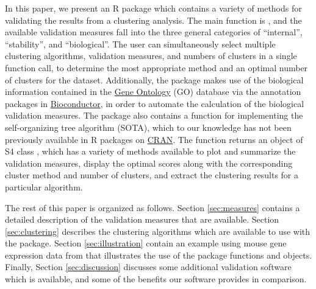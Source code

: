 \documentclass[11pt]{article}
\begin{document}
In this paper, we present an R package  which contains a
variety of methods for validating the results
from a clustering analysis.  
The main function is , and the available validation measures fall into the three general
categories of ``internal'', ``stability'', and ``biological''.  
The user can simultaneously select multiple clustering algorithms,
validation measures, and numbers of clusters in a single function call,
to determine the most appropriate method and
an optimal number of clusters for the dataset.  
Additionally, the  package
makes use of the biological information contained in the 
\href{http://www.geneontology.org/}{Gene Ontology} 
(GO) database via the annotation packages
in \href{http://www.bioconductor.org/}{Bioconductor},
in order to automate the calculation of the biological validation measures.
The package also contains a function for implementing the
self-organizing tree algorithm (SOTA), which to our knowledge has not
been previously available in R packages on \href{http://www.r-project.org}{CRAN}.
The function
returns an object of S4 class , which has 
a variety of methods available to plot and summarize the validation
measures, display the optimal scores along with the corresponding cluster method
and number of clusters, and extract the clustering results for a
particular algorithm.

The rest of this paper is organized as follows.  Section \ref{sec:measures}
contains a detailed description of the validation measures that are
available.  Section \ref{sec:clustering} describes the clustering
algorithms which are available to use with the 
 package.  Section \ref{sec:illustration}
contain an example using mouse gene expression data from
\citet{Bha2007} that illustrates the use of the  package
functions and objects. Finally, Section \ref{sec:discussion} discusses
some additional validation software which is available, and some of
the benefits our software provides in comparison.
\end{document}
